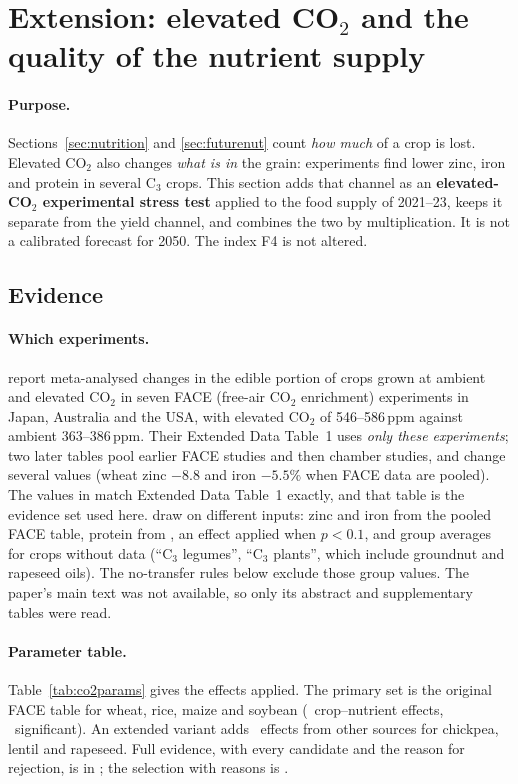 \section{Extension: elevated CO$_2$ and the quality of the nutrient supply}\label{sec:co2}
\paragraph{Purpose.} Sections~\ref{sec:nutrition} and \ref{sec:futurenut} count \emph{how much} of a crop is lost.
Elevated CO$_2$ also changes \emph{what is in} the grain: experiments find lower zinc, iron and protein in several C$_3$
crops. This section adds that channel as an \textbf{elevated-CO$_2$ experimental stress test} applied to the food supply
of 2021--23, keeps it separate from the yield channel, and combines the two by multiplication. It is not a calibrated
forecast for 2050. The index F4 is not altered.

\subsection{Evidence}
\paragraph{Which experiments.} \citet{myers2014} report meta-analysed changes in the edible portion of crops grown at
ambient and elevated CO$_2$ in seven FACE (free-air CO$_2$ enrichment) experiments in Japan, Australia and the USA,
with elevated CO$_2$ of 546--586\,ppm against ambient 363--386\,ppm. Their Extended Data Table~1 uses \emph{only these
experiments}; two later tables pool earlier FACE studies and then chamber studies, and change several values (wheat
zinc $-8.8$ and iron $-5.5\%$ when FACE data are pooled). The values in  match Extended Data Table~1
exactly, and that table is the evidence set used here. \citet{smith2018} draw on different inputs: zinc and iron from
the pooled FACE table, protein from \citet{medek2017}, an effect applied when $p<0.1$, and group averages for crops
without data (``C$_3$ legumes'', ``C$_3$ plants'', which include groundnut and rapeseed oils). The no-transfer rules
below exclude those group values. The paper's main text was not available, so only its abstract and supplementary
tables were read.

\paragraph{Parameter table.} Table~\ref{tab:co2params} gives the effects applied. The primary set is the original
FACE table for wheat, rice, maize and soybean (\cotwoNPrimary\ crop--nutrient effects, \cotwoNPrimarySig\ significant).
An extended variant adds \cotwoNExtended\ effects from other sources for chickpea, lentil and rapeseed. Full evidence,
with every candidate and the reason for rejection, is in ; the selection with
reasons is .

